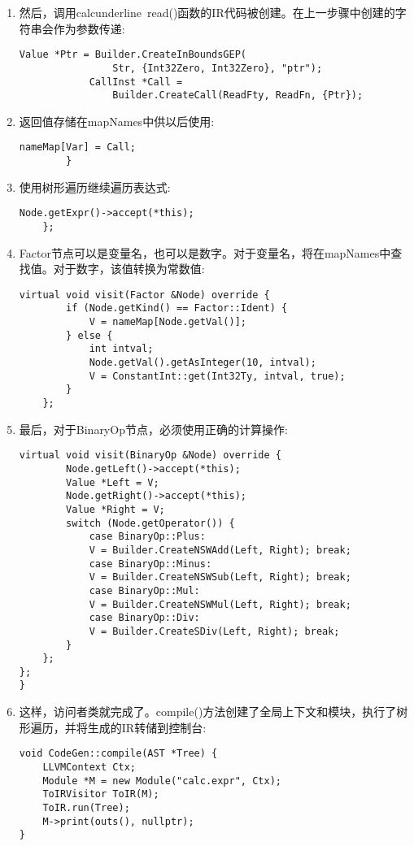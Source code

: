 \begin{enumerate}
\item 然后，调用calcunderline{~}read()函数的IR代码被创建。在上一步骤中创建的字符串会作为参数传递:
\begin{lstlisting}[caption={}]
			Value *Ptr = Builder.CreateInBoundsGEP(
				Str, {Int32Zero, Int32Zero}, "ptr");
			CallInst *Call =
				Builder.CreateCall(ReadFty, ReadFn, {Ptr});
\end{lstlisting}

\item 返回值存储在mapNames中供以后使用:
\begin{lstlisting}[caption={}]
			nameMap[Var] = Call;
		}
\end{lstlisting}

\item 使用树形遍历继续遍历表达式:
\begin{lstlisting}[caption={}]
		Node.getExpr()->accept(*this);
	};
\end{lstlisting}

\item Factor节点可以是变量名，也可以是数字。对于变量名，将在mapNames中查找值。对于数字，该值转换为常数值:
\begin{lstlisting}[caption={}]
	virtual void visit(Factor &Node) override {
		if (Node.getKind() == Factor::Ident) {
			V = nameMap[Node.getVal()];
		} else {
			int intval;
			Node.getVal().getAsInteger(10, intval);
			V = ConstantInt::get(Int32Ty, intval, true);
		}
	};
\end{lstlisting}

\item 最后，对于BinaryOp节点，必须使用正确的计算操作:
\begin{lstlisting}[caption={}]
	virtual void visit(BinaryOp &Node) override {
		Node.getLeft()->accept(*this);
		Value *Left = V;
		Node.getRight()->accept(*this);
		Value *Right = V;
		switch (Node.getOperator()) {
			case BinaryOp::Plus:
			V = Builder.CreateNSWAdd(Left, Right); break;
			case BinaryOp::Minus:
			V = Builder.CreateNSWSub(Left, Right); break;
			case BinaryOp::Mul:
			V = Builder.CreateNSWMul(Left, Right); break;
			case BinaryOp::Div:
			V = Builder.CreateSDiv(Left, Right); break;
		}
	};
};
}
\end{lstlisting}

\item 这样，访问者类就完成了。compile()方法创建了全局上下文和模块，执行了树形遍历，并将生成的IR转储到控制台:
\begin{lstlisting}[caption={}]
void CodeGen::compile(AST *Tree) {
	LLVMContext Ctx;
	Module *M = new Module("calc.expr", Ctx);
	ToIRVisitor ToIR(M);
	ToIR.run(Tree);
	M->print(outs(), nullptr);
}
\end{lstlisting}
\end{enumerate}

